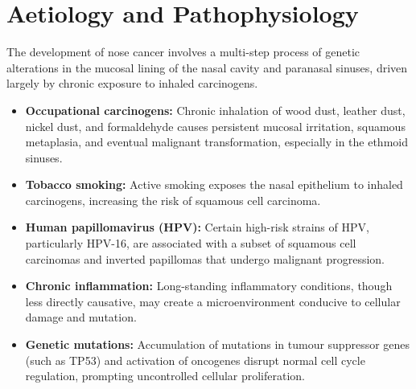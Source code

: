 \section*{Aetiology and Pathophysiology}
The development of nose cancer involves a multi-step process of genetic alterations in the mucosal lining of the nasal cavity and paranasal sinuses, driven largely by chronic exposure to inhaled carcinogens.
\begin{itemize}
    \item \textbf{Occupational carcinogens:} Chronic inhalation of wood dust, leather dust, nickel dust, and formaldehyde causes persistent mucosal irritation, squamous metaplasia, and eventual malignant transformation, especially in the ethmoid sinuses.
    \item \textbf{Tobacco smoking:} Active smoking exposes the nasal epithelium to inhaled carcinogens, increasing the risk of squamous cell carcinoma.
    \item \textbf{Human papillomavirus (HPV):} Certain high-risk strains of HPV, particularly HPV-16, are associated with a subset of squamous cell carcinomas and inverted papillomas that undergo malignant progression.
    \item \textbf{Chronic inflammation:} Long-standing inflammatory conditions, though less directly causative, may create a microenvironment conducive to cellular damage and mutation.
    \item \textbf{Genetic mutations:} Accumulation of mutations in tumour suppressor genes (such as TP53) and activation of oncogenes disrupt normal cell cycle regulation, prompting uncontrolled cellular proliferation.
\end{itemize}

